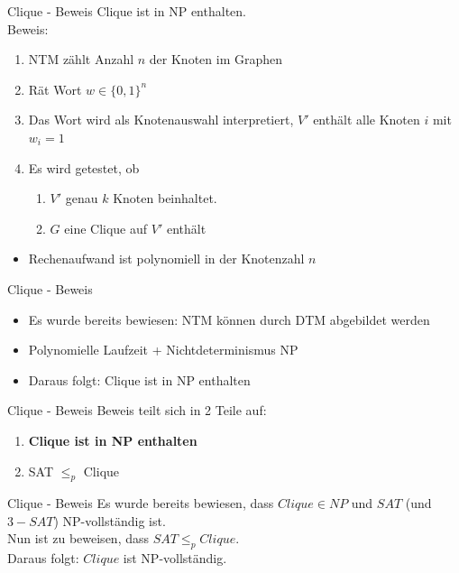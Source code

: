 \documentclass[12pt,handout,notes=dontshow,xcolor=table]{beamer}
\begin{document}
\begin{frame}{Clique - Beweis}
Clique ist in NP enthalten.\\
Beweis:\\
\begin{enumerate}
\item NTM zählt Anzahl \(n\) der Knoten im Graphen
\pause
\item Rät Wort \(w \in \{0,1\}^n\)
\pause
\item Das Wort wird als Knotenauswahl interpretiert, \(V'\) enthält alle Knoten \(i\) mit \(w_i = 1\)
\pause
\item Es wird getestet, ob
\begin{enumerate}
\item \(V'\) genau \(k\) Knoten beinhaltet.
\item \(G\) eine Clique auf \(V'\) enthält
\end{enumerate}
\end{enumerate}
\pause
\begin{itemize}
\item Rechenaufwand ist polynomiell in der Knotenzahl \(n\)
\end{itemize}
\end{frame}

\begin{frame}{Clique - Beweis}
\begin{itemize}
\item Es wurde bereits bewiesen: NTM können durch DTM abgebildet werden
\item Polynomielle Laufzeit + Nichtdeterminismus \textrightarrow NP
\item Daraus folgt: Clique ist in NP enthalten
\end{itemize}
\end{frame}

\begin{frame}{Clique - Beweis}
Beweis teilt sich in 2 Teile auf:
\begin{enumerate}
\item \textbf{Clique ist in NP enthalten} \checkmark
\item SAT $\le_p$ Clique
\end{enumerate}
\end{frame}

\begin{frame}{Clique - Beweis}
Es wurde bereits bewiesen, dass \(Clique \in NP\) und \(SAT\) (und \(3-SAT\)) NP-vollständig ist.\\
Nun ist zu beweisen, dass \(SAT \leq_p Clique\).\\
Daraus folgt: \(Clique\) ist NP-vollständig.
\end{frame}
\end{document}
